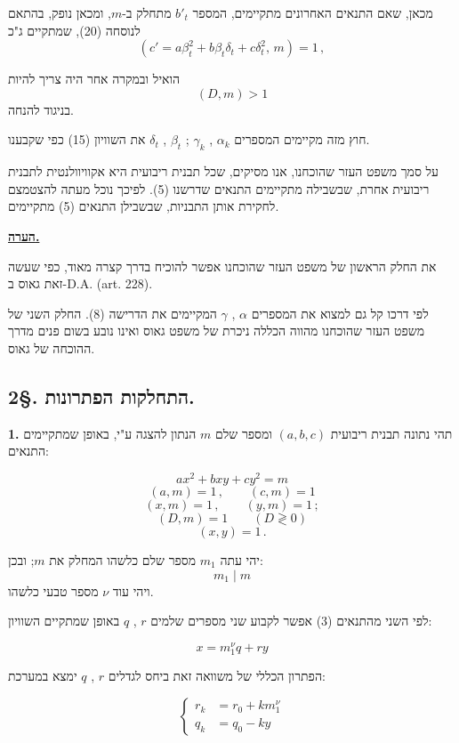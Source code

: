 \noindent מכאן, שאם התנאים האחרונים מתקיימים, המספר $b'_t$ מתחלק ב-$m$, ומכאן נופק, בהתאם לנוסחה (20), שמתקיים ג"כ
\[ (c' = a\beta_t^2 + b\beta_t\delta_t + c\delta_t^2,\, m) = 1 \, , \]

\noindent הואיל ובמקרה אחר היה צריך להיות
\[ (D,m) > 1 \]
\noindent בניגוד להנחה.

\noindent חוץ מזה מקיימים המספרים $\alpha_k$ , $\gamma_k$ ; $\beta_t$ , $\delta_t$ את השוויון (15) כפי שקבענו.

\noindent על סמך משפט העזר שהוכחנו, אנו מסיקים, שכל תבנית ריבועית היא אקוויוולנטית לתבנית ריבועית אחרת, שבשבילה מתקיימים התנאים שדרשנו (5). לפיכך נוכל מעתה להצטמצם לחקירת אותן התבניות, שבשבילן התנאים (5) מתקיימים.

\bigskip
\noindent\textbf{\underline{הערה.}}

\noindent את החלק הראשון של משפט העזר שהוכחנו אפשר להוכיח בדרך קצרה מאוד, כפי שעשה זאת גאוס ב-D.A. (art. 228).

\noindent לפי דרכו קל גם למצוא את המספרים $\alpha$ , $\gamma$ המקיימים את הדרישה (8). החלק השני של משפט העזר שהוכחנו מהווה הכללה ניכרת של משפט גאוס ואינו נובע בשום פנים מדרך ההוכחה של גאוס.

\subsection*{2\S. התחלקות הפתרונות.}

\noindent\textbf{1.} תהי נתונה תבנית ריבועית $(a,b,c)$ ומספר שלם $m$ הנתון להצגה ע"י, באופן שמתקיימים התנאים:

\[ ax^2 + bxy + cy^2 = m \tag{1} \]
\[ (a,m) = 1 \, , \qquad (c,m) = 1 \tag{2} \]
\[ (x,m) = 1 \, , \qquad (y,m) = 1 \, ; \tag{3} \]
\[ (D,m) = 1 \qquad (D \gtrless 0) \tag{4} \]
\[ (x,y) = 1 \, . \tag{5} \]

\noindent יהי עתה $m_1$ מספר שלם כלשהו המחלק את $m$; ובכן:
\[ m_1 \mid m \tag{6} \]
\noindent ויהי עוד $\nu$ מספר טבעי כלשהו.

\noindent לפי השני מהתנאים (3) אפשר לקבוע שני מספרים שלמים $r$ , $q$ באופן שמתקיים השוויון:

\[ \boxed{ x = m_1^{\nu} q + ry } \tag{7} \]

\noindent הפתרון הכללי של משוואה זאת ביחס לגדלים $r$ , $q$ ימצא במערכת:

\[ \left\{ \begin{aligned} r_k &= r_0 + km_1^{\nu} \\ q_k &= q_0 - ky \end{aligned} \right. \tag{8} \]

